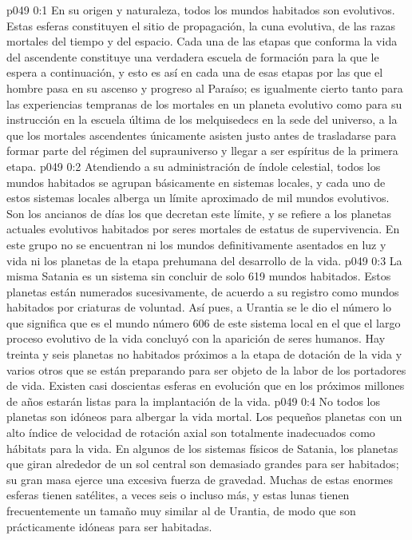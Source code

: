 \author{Melquisedec}
\vs p049 0:1 En su origen y naturaleza, todos los mundos habitados son evolutivos. Estas esferas constituyen el sitio de propagación, la cuna evolutiva, de las razas mortales del tiempo y del espacio. Cada una de las etapas que conforma la vida del ascendente constituye una verdadera escuela de formación para la que le espera a continuación, y esto es así en cada una de esas etapas por las que el hombre pasa en su ascenso y progreso al Paraíso; es igualmente cierto tanto para las experiencias tempranas de los mortales en un planeta evolutivo como para su instrucción en la escuela última de los melquisedecs en la sede del universo, a la que los mortales ascendentes únicamente asisten justo antes de trasladarse para formar parte del régimen del suprauniverso y llegar a ser espíritus de la primera etapa.
\vs p049 0:2 \pc Atendiendo a su administración de índole celestial, todos los mundos habitados se agrupan básicamente en sistemas locales, y cada uno de estos sistemas locales alberga un límite aproximado de mil mundos evolutivos. Son los ancianos de días los que decretan este límite, y se refiere a los planetas actuales evolutivos habitados por seres mortales de estatus de supervivencia. En este grupo no se encuentran ni los mundos definitivamente asentados en luz y vida ni los planetas de la etapa prehumana del desarrollo de la vida.
\vs p049 0:3 \pc La misma Satania es un sistema sin concluir de solo 619 mundos habitados. Estos planetas están numerados sucesivamente, de acuerdo a su registro como mundos habitados por criaturas de voluntad. Así pues, a Urantia se le dio el número  lo que significa que es el mundo número 606 de este sistema local en el que el largo proceso evolutivo de la vida concluyó con la aparición de seres humanos. Hay treinta y seis planetas no habitados próximos a la etapa de dotación de la vida y varios otros que se están preparando para ser objeto de la labor de los portadores de vida. Existen casi doscientas esferas en evolución que en los próximos millones de años estarán listas para la implantación de la vida.
\vs p049 0:4 No todos los planetas son idóneos para albergar la vida mortal. Los pequeños planetas con un alto índice de velocidad de rotación axial son totalmente inadecuados como hábitats para la vida. En algunos de los sistemas físicos de Satania, los planetas que giran alrededor de un sol central son demasiado grandes para ser habitados; su gran masa ejerce una excesiva fuerza de gravedad. Muchas de estas enormes esferas tienen satélites, a veces seis o incluso más, y estas lunas tienen frecuentemente un tamaño muy similar al de Urantia, de modo que son prácticamente idóneas para ser habitadas.
